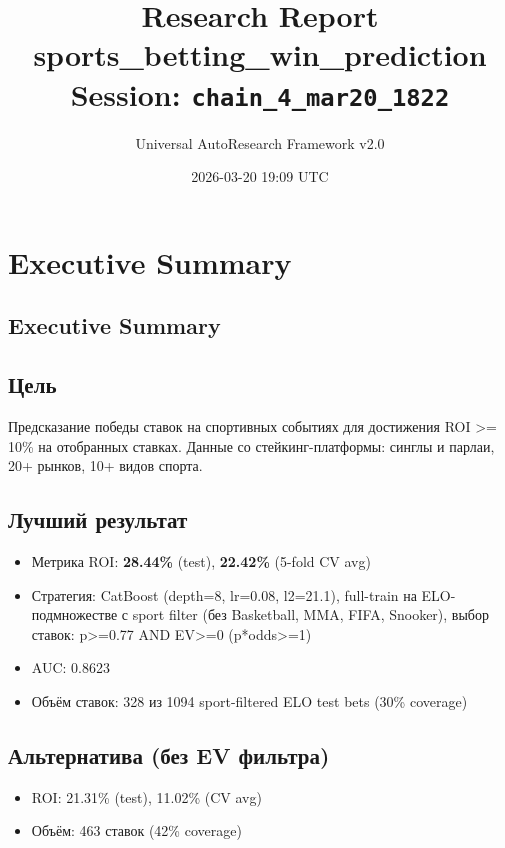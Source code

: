 \documentclass[12pt,a4paper]{article}
\title{
    \Large\textbf{Research Report}\\[0.5em]
    \large sports\_betting\_win\_prediction\\[0.3em]
    \normalsize Session: \texttt{chain\_4\_mar20\_1822}
}
\author{Universal AutoResearch Framework v2.0}
\date{2026-03-20 19:09 UTC}
\begin{document}
\maketitle
\tableofcontents
\newpage


\section{Executive Summary}

\subsection{Executive Summary}

\subsection{Цель}
Предсказание победы ставок на спортивных событиях для достижения ROI >= 10\% на отобранных ставках. Данные со стейкинг-платформы: синглы и парлаи, 20+ рынков, 10+ видов спорта.

\subsection{Лучший результат}
\begin{itemize}
  \item Метрика ROI: \textbf{28.44\%} (test), \textbf{22.42\%} (5-fold CV avg)
  \item Стратегия: CatBoost (depth=8, lr=0.08, l2=21.1), full-train на ELO-подмножестве с sport filter (без Basketball, MMA, FIFA, Snooker), выбор ставок: p>=0.77 AND EV>=0 (p*odds>=1)
  \item AUC: 0.8623
  \item Объём ставок: 328 из 1094 sport-filtered ELO test bets (30\% coverage)
\end{itemize}

\subsection{Альтернатива (без EV фильтра)}
\begin{itemize}
  \item ROI: 21.31\% (test), 11.02\% (CV avg)
  \item Объём: 463 ставок (42\% coverage)
\end{itemize}
\end{document}
